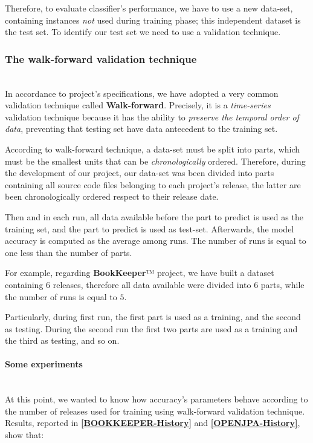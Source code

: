 \documentclass[sigconf]{acmart}
\begin{document}
Therefore, to evaluate classifier's performance, we have to use a new data-set, containing instances \textit{not} used during training phase; this independent dataset is the test set. To identify our test set we need to use a validation technique. 

\subsubsection{The walk-forward validation technique}
\hfill\\

In accordance to project's specifications, we have adopted a very common validation technique called \textbf{Walk-forward}. Precisely, it is a \textit{time-series} validation technique because it has the ability to \textit{preserve the temporal order of data}, preventing that testing set have data antecedent to the training set.

According to walk-forward technique, a data-set must be split into parts, which must be the smallest units that can be \textit{chronologically} ordered. Therefore, during the development of our project, our data-set was been divided into parts containing all source code files belonging to each project's release, the latter are been chronologically ordered respect to their release date.

Then and in each run, all data available before the part to predict is used as the training set, and the part to predict is used as test-set. Afterwards, the model accuracy is computed as the average among runs. The number of runs is equal to one less than the number of parts.

For example, regarding \textbf{BookKeeper}™ project, we have built a dataset containing $6$ releases, therefore all data available were divided into $6$ parts, while the number of runs is equal to $5$.

Particularly, during first run, the first part is used as a training, and the second as testing. During the second run the first two parts are used as a training and the third as testing, and so on. 
 
\paragraph{Some experiments} 
\hfill\\
At this point, we wanted to know how accuracy's parameters behave according to the number of releases used for training using walk-forward validation technique. Results, reported in \textbf{\cref{BOOKKEEPER-History}} and \textbf{\cref{OPENJPA-History}}, show that:
\end{document}
